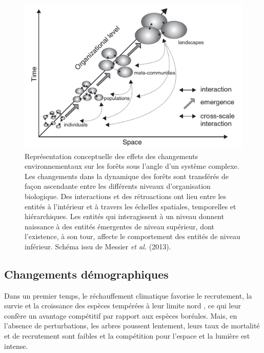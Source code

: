 \begin{figure}
\centering
\includegraphics[width=.8\textwidth]{conclusion/figures/complex.png}
\caption[Représentation conceptuelle des effets des changements environnementaux sur les différents niveaux d'organisation biologique]{Représentation conceptuelle des effets des changements environnementaux sur les forêts sous l'angle d'un système complexe. Les changements dans la dynamique des forêts sont transférés de façon ascendante entre les différents niveaux d'organisation biologique. Des interactions et des rétroactions ont lieu entre les entités à l'intérieur et à travers les échelles spatiales, temporelles et hiérarchiques. Les entités qui interagissent à un niveau donnent naissance à des entités émergentes de niveau supérieur, dont l'existence, à son tour, affecte le comportement des entités de niveau inférieur. Schéma issu de Messier \emph{et al.} (2013).}
\label{fig4.2}
\end{figure}

\hypertarget{changements-duxe9mographiques}{%
\subsection{Changements
démographiques}\label{changements-duxe9mographiques}}

Dans un premier temps, le réchauffement climatique favorise le
recrutement, la survie et la croissance des espèces tempérées à leur
limite nord
\citep{fisichelli_temperate_2014, boisvertmarsh_divergent_2019, goldblum_tree_2005, grundmann_impact_2011, bolte_understory_2014},
ce qui leur confère un avantage compétitif par rapport aux espèces
boréales. Mais, en l'absence de perturbations, les arbres poussent
lentement, leurs taux de mortalité et de recrutement sont faibles et la
compétition pour l'espace et la lumière est intense.

